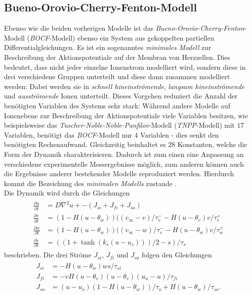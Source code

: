\subsection{Bueno-Orovio-Cherry-Fenton-Modell}
Ebenso wie die beiden vorherigen Modelle ist das \textit{Bueno-Orovio-Cherry-Fenton}-Modell (\textit{BOCF}-Modell) ebenso ein System aus gekoppelten partiellen Differentialgleichungen. Es ist ein sogenanntes \textit{minimales Modell} zur Beschreibung der Aktionspotentiale auf der Membran von Herzzellen. Dies bedeutet, dass nicht jeder einzelne Ionenstrom modelliert wird, sondern diese in drei verschiedene Gruppen unterteilt und diese dann zusammen modelliert werden: Dabei werden sie in \textit{schnell hineinströmende}, \textit{langsam hineinströmende} und \textit{ausströmende} Ionen unterteilt. Dieses Vorgehen reduziert die Anzahl der benötigten Variablen des Systems sehr stark: Während andere Modelle auf Ionenebene zur Beschreibung der Aktionspotentiale viele Variablen besitzen, wie beispielsweise das \textit{Tuscher-Noble-Noble-Panfilov}-Modell (\textit{TNPP}-Modell) mit $17$ Variablen, benötigt das \textit{BOCF}-Modell nur $4$ Variablen - dies senkt den benötigten Rechenaufwand. Gleichzeitig beinhaltet es $28$ Konstanten, welche die Form der Dynamik charakterisieren. Dadurch ist zum einen eine Anpassung an verschiedene experimentelle Messergebnisse möglich, zum anderen können auch die Ergebnisse anderer bestehender Modelle reproduziert werden. Hierdurch kommt die Bezeichung des \textit{minimalen Modells} zustande \citep{Bueno-Orovio2008}.\\

Die Dynamik wird durch die Gleichungen 
\begin{align}
\begin{aligned}
\frac{\partial u}{\partial t} &= D \nabla^2 u + - (J_{si} + J_{fi} + J_{so})\\
\frac{\partial v}{\partial t} &= (1-H(u-\theta_w))((v_\infty - v)/\tau_v^- - H(u-\theta_v)v/\tau_v^+ \\
\frac{\partial w}{\partial t} &= (1-H(u-\theta_w))((v_\infty - w)/\tau_v^- - H(u-\theta_w)v/\tau_w^+ \\
\frac{\partial s}{\partial t} &= ((1 + \tanh(k_s(u-u_s)))/2 - s)/\tau_s
\end{aligned}
\end{align}
beschrieben. Die drei Ströme $J_{si}$, $J_{fi}$ und $J_{so}$ folgen den Gleichungen
\begin{align}
\begin{aligned}
J_{si} &= -H(u-\theta_w)ws/\tau_{si} \\
J_{fi} &= -vH(u-\theta_v)(u-\theta_v)(u_u - u)/\tau_{fi} \\
J_{so} &= (u-u_o)(1-H(u-\theta_w))/\tau_o + H(u-\theta_w)/\tau_{so}.
\end{aligned}
\end{align}

